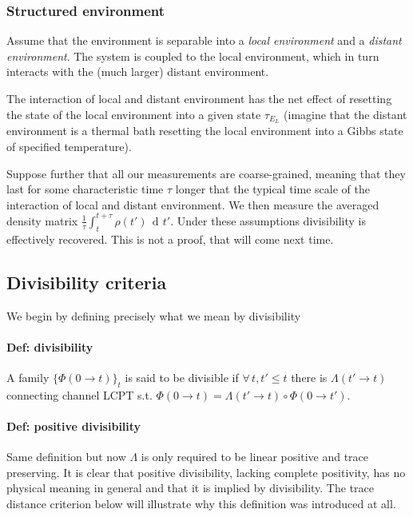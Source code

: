 \documentclass[a4paper, 11pt]{article}
\newcommand{\dd}{\mathop{\mathrm{d}\!}{}}
\begin{document}
	\subsubsection{Structured environment}
	Assume that the environment is separable into a \emph{local environment} and a \emph{distant environment}. The system is coupled to the local environment, which in turn interacts with the (much larger) distant environment.
	
	The interaction of local and distant environment has the net effect of resetting the state of the local environment into a given state $\tau_{E_L}$ (imagine that the distant environment is a thermal bath resetting the local environment into a Gibbs state of specified temperature).
	
	Suppose further that all our measurements are coarse-grained, meaning that they last for some characteristic time $\tau$ longer that the typical time scale of the interaction of local and distant environment. We then measure the averaged density matrix $\frac{1}{\tau} \int_{t}^{t+\tau} \rho(t')\,\dd t'$. Under these assumptions divisibility is effectively recovered. This is not a proof, that will come next time.
	
	\subsection{Divisibility criteria}
	We begin by defining precisely what we mean by divisibility
	\paragraph{Def: divisibility} A family $\{\Phi(0\rightarrow t)\}_t$ is said to be divisible if $\forall\,t, t'\le t$ there is $\Lambda(t'\rightarrow t)$ connecting channel LCPT s.t. $\Phi(0\rightarrow t) = \Lambda(t'\rightarrow t) \circ \Phi(0\rightarrow t')$.
	
	\paragraph{Def: positive divisibility} Same definition but now $\Lambda$ is only required to be linear positive and trace preserving. It is clear that positive divisibility, lacking complete positivity, has no physical meaning in general and that it is implied by divisibility. The trace distance criterion below will illustrate why this definition was introduced at all.
	\vspace{4mm}
	
\end{document}
